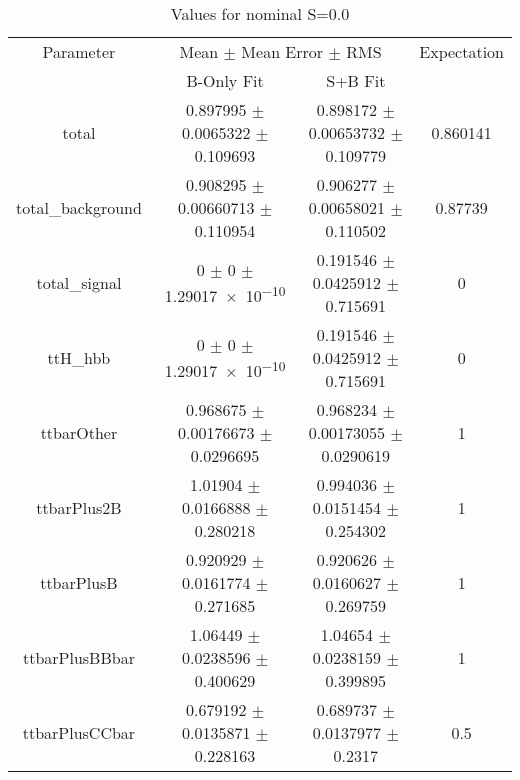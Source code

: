 \begin{table}
\centering
\caption{Values for nominal S=0.0}
\begin{tabular}{cccc}
\toprule
Parameter & \multicolumn{2}{c}{Mean $\pm$ Mean Error $\pm$ RMS} & Expectation\\
 & B-Only Fit & S+B Fit & \\
\midrule
total & \num{0.897995} $\pm$ \num{0.0065322} $\pm$ \num{0.109693} & \num{0.898172} $\pm$ \num{0.00653732} $\pm$ \num{0.109779} & \num{0.860141}\\
total\_background & \num{0.908295} $\pm$ \num{0.00660713} $\pm$ \num{0.110954} & \num{0.906277} $\pm$ \num{0.00658021} $\pm$ \num{0.110502} & \num{0.87739}\\
total\_signal & \num{0} $\pm$ \num{0} $\pm$ \num{1.29017e-10} & \num{0.191546} $\pm$ \num{0.0425912} $\pm$ \num{0.715691} & \num{0}\\
ttH\_hbb & \num{0} $\pm$ \num{0} $\pm$ \num{1.29017e-10} & \num{0.191546} $\pm$ \num{0.0425912} $\pm$ \num{0.715691} & \num{0}\\
ttbarOther & \num{0.968675} $\pm$ \num{0.00176673} $\pm$ \num{0.0296695} & \num{0.968234} $\pm$ \num{0.00173055} $\pm$ \num{0.0290619} & \num{1}\\
ttbarPlus2B & \num{1.01904} $\pm$ \num{0.0166888} $\pm$ \num{0.280218} & \num{0.994036} $\pm$ \num{0.0151454} $\pm$ \num{0.254302} & \num{1}\\
ttbarPlusB & \num{0.920929} $\pm$ \num{0.0161774} $\pm$ \num{0.271685} & \num{0.920626} $\pm$ \num{0.0160627} $\pm$ \num{0.269759} & \num{1}\\
ttbarPlusBBbar & \num{1.06449} $\pm$ \num{0.0238596} $\pm$ \num{0.400629} & \num{1.04654} $\pm$ \num{0.0238159} $\pm$ \num{0.399895} & \num{1}\\
ttbarPlusCCbar & \num{0.679192} $\pm$ \num{0.0135871} $\pm$ \num{0.228163} & \num{0.689737} $\pm$ \num{0.0137977} $\pm$ \num{0.2317} & \num{0.5}\\
\bottomrule
\end{tabular}
\end{table}